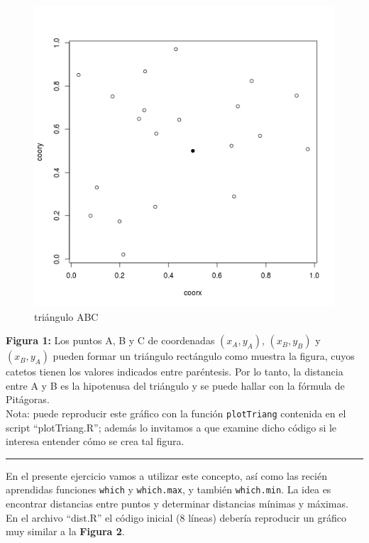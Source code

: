 \documentclass[]{article}
\makeatletter
\def\maxwidth{\ifdim\Gin@nat@width>\linewidth\linewidth
\else\Gin@nat@width\fi}
\let\Oldincludegraphics\includegraphics
\renewcommand{\includegraphics}[1]{\Oldincludegraphics[width=\maxwidth]{#1}}
\makeatother
\begin{document}
\begin{figure}[htbp]
\centering
\includegraphics{figure/unnamed-chunk-11.png}
\caption{triángulo ABC}
\end{figure}

\textbf{Figura 1:} Los puntos A, B y C de coordenadas $(x_A, y_A)$,
$(x_B, y_B)$ y $(x_B, y_A)$ pueden formar un triángulo rectángulo como
muestra la figura, cuyos catetos tienen los valores indicados entre
paréntesis. Por lo tanto, la distancia entre A y B es la hipotenusa del
triángulo y se puede hallar con la fórmula de Pitágoras.\\Nota: puede
reproducir este gráfico con la función \texttt{plotTriang} contenida en
el script ``plotTriang.R''; además lo invitamos a que examine dicho
código si le interesa entender cómo se crea tal figura.

\begin{center}\rule{3in}{0.4pt}\end{center}

En el presente ejercicio vamos a utilizar este concepto, así como las
recién aprendidas funciones \texttt{which} y \texttt{which.max}, y
también \texttt{which.min}. La idea es encontrar distancias entre puntos
y determinar distancias mínimas y máximas. En el archivo ``dist.R'' el
código inicial (8 líneas) debería reproducir un gráfico muy similar a la
\textbf{Figura 2}.
\end{document}
